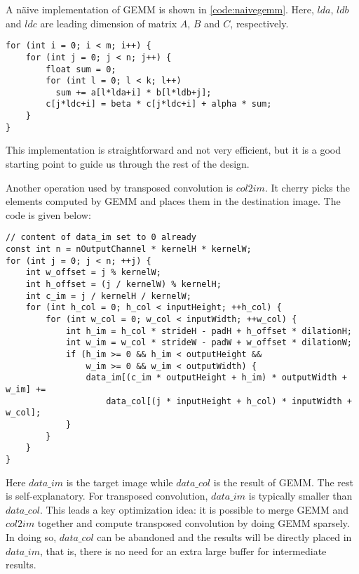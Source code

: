 A näive implementation of GEMM is shown in \ref{code:naivegemm}. Here, $lda$, $ldb$ and $ldc$ are leading
dimension of matrix $A$, $B$ and $C$, respectively.

\begin{code}
\begin{verbatim}
for (int i = 0; i < m; i++) {
    for (int j = 0; j < n; j++) {
        float sum = 0;
        for (int l = 0; l < k; l++)
          sum += a[l*lda+i] * b[l*ldb+j];
        c[j*ldc+i] = beta * c[j*ldc+i] + alpha * sum;
    }
}
\end{verbatim}
\label{code:naivegemm}
\end{code}

This implementation is straightforward and not very efficient, but it is a good starting point to guide
us through the rest of the design.

Another operation used by transposed convolution is $col2im$. It cherry picks the elements computed by GEMM
and places them in the destination image. The code is given below:

\begin{code}
\begin{verbatim}
// content of data_im set to 0 already
const int n = nOutputChannel * kernelH * kernelW;
for (int j = 0; j < n; ++j) {
    int w_offset = j % kernelW;
    int h_offset = (j / kernelW) % kernelH;
    int c_im = j / kernelH / kernelW;
    for (int h_col = 0; h_col < inputHeight; ++h_col) {
        for (int w_col = 0; w_col < inputWidth; ++w_col) {
            int h_im = h_col * strideH - padH + h_offset * dilationH;
            int w_im = w_col * strideW - padW + w_offset * dilationW;
            if (h_im >= 0 && h_im < outputHeight &&
                w_im >= 0 && w_im < outputWidth) {
                data_im[(c_im * outputHeight + h_im) * outputWidth + w_im] +=
                    data_col[(j * inputHeight + h_col) * inputWidth + w_col];
            }
        }
    }
}
\end{verbatim}
\label{code:col2im}
\end{code}

Here $data\_im$ is the target image while $data\_col$ is the result of GEMM. The rest is self-explanatory.
For transposed convolution, $data\_im$ is typically smaller than $data\_col$. This leads a key optimization
idea: it is possible to merge GEMM and $col2im$ together and compute transposed convolution by doing GEMM
sparsely. In doing so, $data\_col$ can be abandoned and the results will be directly placed in $data\_im$,
that is, there is no need for an extra large buffer for intermediate results.

